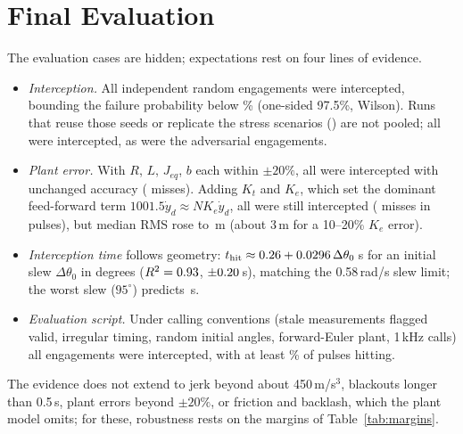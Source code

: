 \documentclass[conference]{IEEEtran}
\begin{document}
\section{Final Evaluation}
\label{sec:final}
The evaluation cases are hidden; expectations rest on four lines of evidence.
\begin{itemize}
\item \emph{Interception.} All \mcN{} independent random engagements were intercepted, bounding the failure probability below \mcFailUB\% (one-sided 97.5\%, Wilson). Runs that reuse those seeds or replicate the stress scenarios (\otherN) are not pooled; all were intercepted, as were the \hgN{} adversarial engagements.
\item \emph{Plant error.} With $R$, $L$, $J_{eq}$, $b$ each within $\pm20\%$, all \pertOK{} were intercepted with unchanged accuracy (\pertMiss{} misses). Adding $K_t$ and $K_e$, which set the dominant feed-forward term $1001.5\dot y_d\approx NK_e\dot y_d$, all \pertSixOK{} were still intercepted (\pertSixMiss{} misses in \pertSixPulses{} pulses), but median RMS rose to \pertSixRms\,m (about 3\,m for a 10--20\% $K_e$ error).
\item \emph{Interception time} follows geometry: $t_{\mathrm{hit}}\approx0.26+0.0296\,\Delta\theta_0$\,s for an initial slew $\Delta\theta_0$ in degrees ($R^2=0.93$, $\pm0.20$\,s), matching the 0.58\,rad/s slew limit; the worst slew ($95^\circ$) predicts \slewWorst\,s.
\item \emph{Evaluation script.} Under \ifVariants{} calling conventions (stale measurements flagged valid, irregular timing, random initial angles, forward-Euler plant, 1\,kHz calls) all \ifOK{} engagements were intercepted, with at least \ifHitMin\% of pulses hitting.
\end{itemize}
The evidence does not extend to jerk beyond about 450\,m/s$^3$, blackouts longer than 0.5\,s, plant errors beyond $\pm20\%$, or friction and backlash, which the plant model omits; for these, robustness rests on the margins of Table~\ref{tab:margins}.

\end{document}
